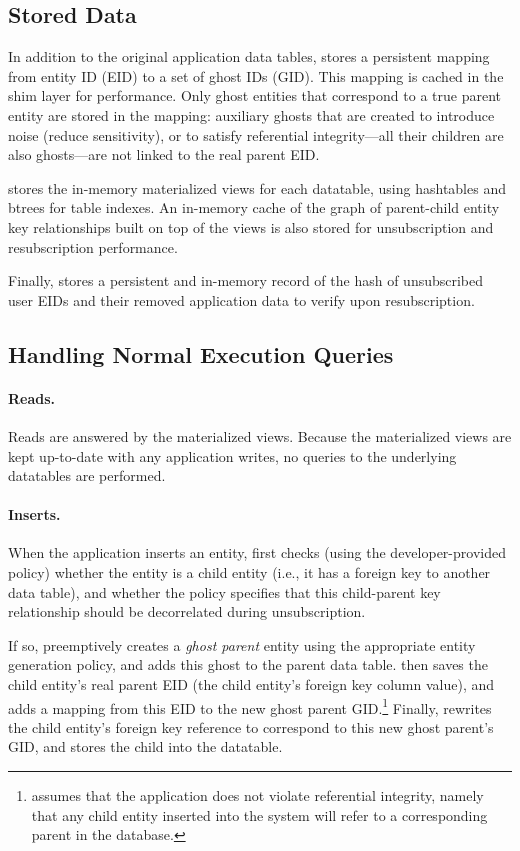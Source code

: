\subsection{Stored Data}
In addition to the original application data tables, \sys stores a persistent mapping from entity
ID (EID) to a set of ghost IDs (GID). This mapping is cached in the shim layer for performance. Only
ghost entities that correspond to a true parent entity are stored in the mapping: auxiliary ghosts that are
created to introduce noise (reduce sensitivity), or to satisfy referential integrity---all their
children are also ghosts---are not linked to the real parent EID.

\sys stores the in-memory materialized views for each datatable, using hashtables and btrees for
table indexes. An in-memory cache of the graph of parent-child entity key relationships built on
top of the views is also stored for unsubscription and resubscription performance.

Finally, \sys stores a persistent and in-memory record of the hash of unsubscribed user EIDs 
and their removed application data to verify upon resubscription.

\subsection{Handling Normal Execution Queries}
\paragraph{Reads.}
Reads are answered by the materialized views. Because the materialized views are kept up-to-date with any application
writes, no queries to the underlying datatables are performed.

\paragraph{Inserts.}
When the application inserts an entity, \sys first checks (using the developer-provided policy)
whether the entity is a child entity (i.e., it has a foreign key to another data table), and
whether the policy specifies that this child-parent key relationship should be decorrelated during
unsubscription. 

If so, \sys preemptively creates a \emph{ghost parent} entity using the appropriate entity
generation policy, and adds this ghost to the parent data table. \sys then saves the child
entity's real parent EID (the child entity's foreign key column value), and adds a mapping from this
EID to the new ghost parent GID.\footnote{\sys assumes that the application does not violate
referential integrity, namely that any child entity inserted into the system will refer to a
corresponding parent in the database.} Finally, \sys rewrites the child entity's foreign key
reference to correspond to this new ghost parent's GID, and stores the child into the datatable.

